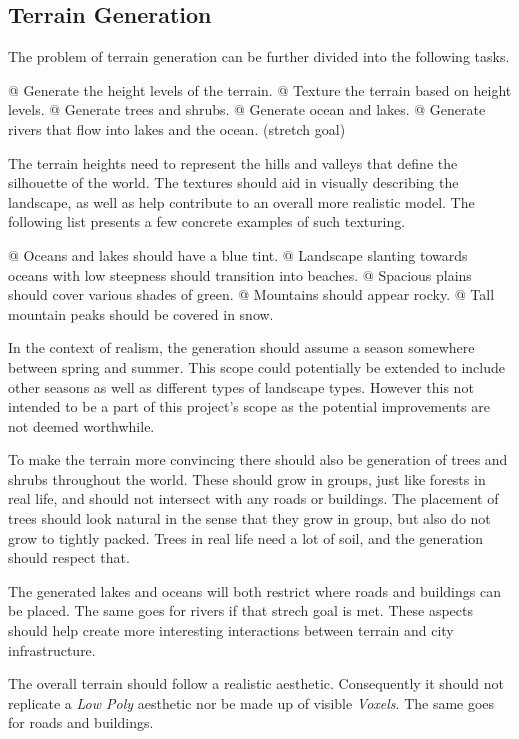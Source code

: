 \subsection{Terrain Generation}

The problem of terrain generation can be further divided into the following tasks.
\begin{easylist}
  @ Generate the height levels of the terrain.
  @ Texture the terrain based on height levels.
  @ Generate trees and shrubs.
  @ Generate ocean and lakes.
  @ Generate rivers that flow into lakes and the ocean. (stretch goal)
\end{easylist}

The terrain heights need to represent the hills and valleys that define the silhouette of the world.
The textures should aid in visually describing the landscape, as well as help contribute to an overall more realistic model.
The following list presents a few concrete examples of such texturing.
\begin{easylist}
  @ Oceans and lakes should have a blue tint.
  @ Landscape slanting towards oceans with low steepness should transition into beaches.
  @ Spacious plains should cover various shades of green.
  @ Mountains should appear rocky.
  @ Tall mountain peaks should be covered in snow.
\end{easylist}

In the context of realism, the generation should assume a season somewhere between spring and summer.
This scope could potentially be extended to include other seasons as well as different types of landscape types.
However this not intended to be a part of this project's scope as the potential improvements are not deemed worthwhile.

To make the terrain more convincing there should also be generation of trees and shrubs throughout the world.
These should grow in groups, just like forests in real life, and should not intersect with any roads or buildings.
The placement of trees should look natural in the sense that they grow in group, but also do not grow to tightly packed.
Trees in real life need a lot of soil, and the generation should respect that.

The generated lakes and oceans will both restrict where roads and buildings can be placed.
The same goes for rivers if that strech goal is met.
These aspects should help create more interesting interactions between terrain and city infrastructure.

The overall terrain should follow a realistic aesthetic.
Consequently it should not replicate a \textit{Low Poly} aesthetic nor be made up of visible \textit{Voxels}.
The same goes for roads and buildings.